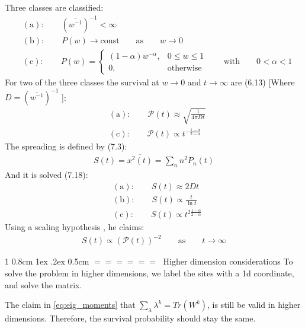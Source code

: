 \documentclass[onecolumn,fleqn,notitlepage,secnumarabic]{revtex4}
\makeatletter
\def\section{%
  \@startsection
    {section}%
    {1}%
    {\z@}%
    {0.8cm \@plus1ex \@minus .2ex}%
    {0.5cm}%
    {\Large\bf $=\!=\!=\!=\!=\!=\;$}%
}%
\makeatother
\begin{document}
Three classes are classified:
\begin{align} 
    &\mathrm{(a) : }\qquad (\overline{w^{-1}})^{-1} < \infty  \\
    &\mathrm{(b) : }\qquad P(w)\rightarrow \mathrm{const} \qquad\mathrm{as}\qquad w \rightarrow 0 \\
    &\mathrm{(c) : }\qquad P(w) = 
        \begin{cases} 
            (1-\alpha)w^{-\alpha} , & 0\le w \le 1 \\
            0, & \mathrm{otherwise}
        \end{cases}
        \qquad\mathrm{with}\qquad 0<\alpha<1
\end{align}
For two of the three classes the survival at $w\rightarrow 0$ and $t\rightarrow \infty$ are (6.13) [Where $D=(\overline{w^{-1}})^{-1}$ ]:
\begin{align}
&\mathrm{(a) : }\qquad \mathcal{P}(t) \approx \sqrt{\frac{1}{4\pi D t}}  \\
&\mathrm{(c) : }\qquad \mathcal{P}(t) \propto t^{-\frac{1-\alpha}{2-\alpha}}
\end{align}
The spreading is defined by (7.3):
\begin{align}\label{eq:spreading}
     S(t) = \overline{x^2(t)} = \sum_n n^2 P_n(t) 
\end{align}
And it is solved (7.18):
\begin{align}
    &\mathrm{(a) : }\qquad S(t) \approx 2Dt  \\
    &\mathrm{(b) : }\qquad S(t) \propto \frac{t}{\ln t}  \\
    &\mathrm{(c) : }\qquad S(t) \propto t^{2\frac{1-\alpha}{2-\alpha}}
\end{align}
Using a scaling hypothesis , he claims:
\begin{align}\label{eq:scaling_hypo}
S(t) \propto \left(\mathcal{P}(t)\right)^{-2} \qquad \mathrm{as}\qquad t\rightarrow \infty
\end{align}

\section{Higher dimension considerations}
To solve the problem in higher dimensions, we label the sites with a 1d coordinate, and solve the matrix.

The claim in \eqref{eq:eig_moments} that $\sum_\lambda \lambda^k = Tr (W^k)$, is still be valid in higher dimensions. Therefore, the survival probability should stay the same.
\end{document}
